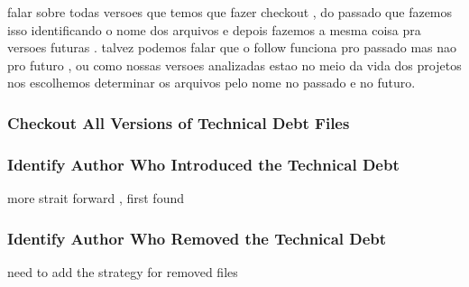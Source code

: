 falar sobre todas versoes que temos que fazer checkout , do passado que fazemos isso identificando o nome dos arquivos e depois fazemos a mesma coisa pra versoes futuras . talvez podemos falar que o follow funciona pro passado mas nao pro futuro , ou como nossas versoes analizadas estao no meio da vida dos projetos nos escolhemos determinar os arquivos pelo nome no passado e no futuro. 

\subsubsection*{Checkout All Versions of Technical Debt Files}
\label{subsub:checkout_all_versions_of_technical_debt_files}

\subsubsection*{Identify Author Who Introduced the Technical Debt}
\label{subsub:identify_author_who_introduced_the_technical_debt}
more strait forward , first found

\subsubsection*{Identify Author Who Removed the Technical Debt}
\label{subsub:identify_author_who_removed_the_technical_debt}
need to add the strategy for removed files


